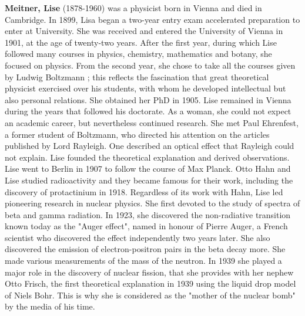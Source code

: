 \textbf{Meitner, Lise} (1878-1960) was a physicist born in Vienna and died in Cambridge. In 1899, Lisa began a two-year entry exam accelerated preparation to enter at University. She was received and entered the University of Vienna in 1901, at the age of twenty-two years. After the first year, during which Lise followed many courses in physics, chemistry, mathematics and botany, she focused on physics. From the second year, she chose to take all the courses given by Ludwig Boltzmann ; this reflects the fascination that great theoretical physicist exercised over his students, with whom he developed intellectual but also personal relations. She obtained her PhD in 1905. Lise remained in Vienna during the years that followed his doctorate. As a woman, she could not expect an academic career, but nevertheless continued research. She met Paul Ehrenfest, a former student of Boltzmann, who directed his attention on the articles published by Lord Rayleigh. One described an optical effect that Rayleigh could not explain. Lise founded the theoretical explanation and derived observations. Lise went to Berlin in 1907 to follow the course of Max Planck. Otto Hahn and Lise studied radioactivity and they became famous for their work, including the discovery of protactinium in 1918. Regardless of its work with Hahn, Lise led pioneering research in nuclear physics. She first devoted to the study of spectra of beta and gamma radiation. In 1923, she discovered the non-radiative transition known today as the "Auger effect", named in honour of Pierre Auger, a French scientist who discovered the effect independently two years later. She also discovered the emission of electron-positron pairs in the beta decay more. She made various measurements of the mass of the neutron. In 1939 she played a major role in the discovery of nuclear fission, that she provides with her nephew Otto Frisch, the first theoretical explanation in 1939 using the liquid drop model of Niels Bohr. This is why she is considered as the "mother of the nuclear bomb" by the media of his time.


